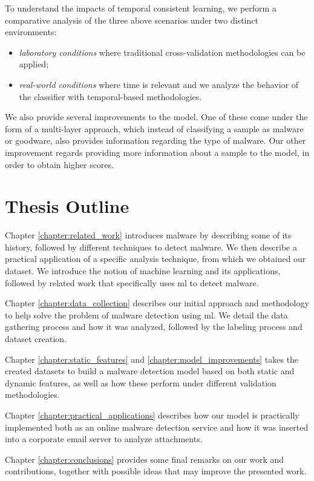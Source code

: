 To understand the impacts of temporal consistent learning, we perform a comparative analysis of the three above scenarios under two distinct environments:

\begin{itemize}
	\item \textit{laboratory conditions} where traditional cross-validation methodologies can be applied;
	\item \emph{real-world conditions} where time is relevant and we analyze the behavior of the classifier with temporal-based methodologies.
\end{itemize}

We also provide several improvements to the model.
One of these come under the form of a multi-layer approach, which instead of classifying a sample as malware or goodware, also provides information regarding the type of malware.
Our other improvement regards providing more information about a sample to the model, in order to obtain higher scores.

\section{Thesis Outline}
\label{section:outline}

Chapter \ref{chapter:related_work} introduces malware by describing some of its history, followed by different techniques to detect malware. We then describe a practical application of a specific analysis technique, from which we obtained our dataset.
We introduce the notion of machine learning and its applications, followed by related work that specifically uses \gls{ml} to detect malware. 

Chapter \ref{chapter:data_collection} describes our initial approach and methodology to help solve the problem of malware detection using \gls{ml}. We detail the data gathering process and how it was analyzed, followed by the labeling process and dataset creation.

Chapter \ref{chapter:static_features} and \ref{chapter:model_improvements} takes the created datasets to build a malware detection model based on both static and dynamic features, as well as how these perform under different validation methodologies.

Chapter \ref{chapter:practical_applications} describes how our model is practically implemented both as an online malware detection service and how it was inserted into a corporate email server to analyze attachments.

Chapter \ref{chapter:conclusions} provides some final remarks on our work and contributions, together with possible ideas that may improve the presented work.
